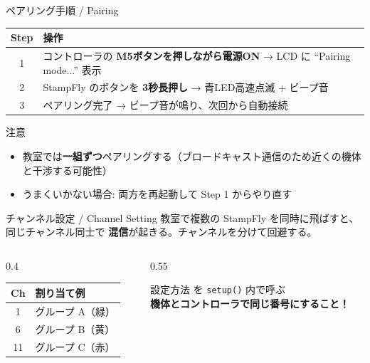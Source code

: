 \begin{frame}{ペアリング手順 / Pairing}
  \begin{table}
    \centering
    \begin{tabular}{cp{120mm}}
      \hline
      \textbf{Step} & \textbf{操作} \\
      \hline
      1 & コントローラの \textbf{M5ボタンを押しながら電源ON} → LCD に ``Pairing mode...'' 表示 \\
      2 & StampFly のボタンを \textbf{3秒長押し} → 青LED高速点滅 + ビープ音 \\
      3 & ペアリング完了 → ビープ音が鳴り、次回から自動接続 \\
      \hline
    \end{tabular}
  \end{table}

  \begin{alertblock}{注意}
    \begin{itemize}
      \item 教室では\textbf{一組ずつ}ペアリングする（ブロードキャスト通信のため近くの機体と干渉する可能性）
      \item うまくいかない場合: 両方を再起動して Step 1 からやり直す
    \end{itemize}
  \end{alertblock}
\end{frame}

\begin{frame}{チャンネル設定 / Channel Setting}
  教室で複数の StampFly を同時に飛ばすと、同じチャンネル同士で
  \textbf{混信}が起きる。チャンネルを分けて回避する。

  \vspace{0.5em}

  \begin{columns}[c]
    \begin{column}{0.4\textwidth}
      \centering
      \begin{tabular}{cl}
        \hline
        \textbf{Ch} & \textbf{割り当て例} \\
        \hline
        1  & \textcolor{green!70!black}{グループ A（緑）} \\
        6  & \textcolor{yellow!80!black}{グループ B（黄）} \\
        11 & \textcolor{red!80!black}{グループ C（赤）} \\
        \hline
      \end{tabular}
    \end{column}
    \begin{column}{0.55\textwidth}
      \begin{alertblock}{設定方法}
         を \texttt{setup()} 内で呼ぶ\\
        \textbf{機体とコントローラで同じ番号にすること！}
      \end{alertblock}
    \end{column}
  \end{columns}
\end{frame}

